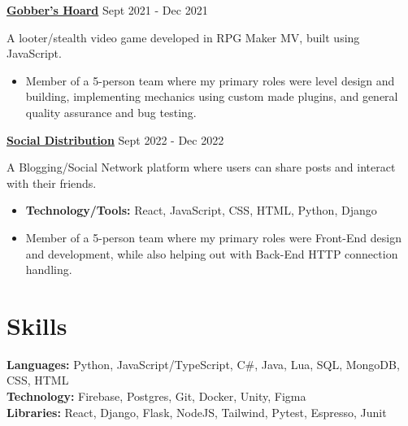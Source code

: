 \documentclass[letterpaper, 10pt]{article}
\newcommand{\bulletSpace}{\vspace{-4pt}}
\newcommand{\secStartSpace}{\vspace{3pt}}
\newcommand{\secEndSpace}{\vspace{5pt}}
\newcommand{\spaceCollapse}{\vspace{-2pt}}
\newcommand{\projectHeader}[3]{
\noindent\href{#2}{\large\textbf{#1}} \hfill \normalsize#3 \vspace{2pt}
}
\begin{document}
\begin{addmargin}[0.5em]{1em}

		
	\projectHeader{Gobber's Hoard}{https://bathrobe-studios.github.io}{Sept 2021 - Dec 2021}

	\noindent A looter/stealth video game developed in RPG Maker MV, built using JavaScript.
	\spaceCollapse
	\begin{itemize}
		\item Member of a 5-person team where my primary roles were level design and building, implementing mechanics using custom made plugins, and general quality assurance and bug testing.
	\end{itemize}
 
	\projectHeader{Social Distribution}{https://github.com/CMPUT404-Fall22-Project/Group-Project}{Sept 2022 - Dec 2022}
		
	\noindent A Blogging/Social Network platform where users can share posts and interact with their friends.
	\spaceCollapse
	\begin{itemize}
		\item \textbf{Technology/Tools:} React, JavaScript, CSS, HTML, Python, Django
		      \bulletSpace
		\item Member of a 5-person team where my primary roles were Front-End design and development, while also helping out with Back-End HTTP connection handling.
	\end{itemize}
\end{addmargin}
\secEndSpace
\secEndSpace



\section{\color{blue} \textbf{Skills}}
\secStartSpace

\begin{addmargin}[0.5em]{1em}
	\noindent \textbf{Languages:} Python, JavaScript/TypeScript, C\#, Java, Lua, SQL, MongoDB, CSS, HTML \\
	\noindent \textbf{Technology:} Firebase, Postgres, Git, Docker, Unity, Figma \\
	\noindent \textbf{Libraries:} React, Django, Flask, NodeJS, Tailwind, Pytest, Espresso, Junit
\end{addmargin}
\secEndSpace
\secEndSpace
\end{document}
